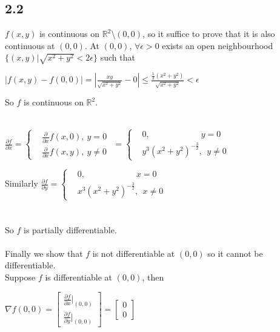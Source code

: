\documentclass[12pt,a4paper,titlepage]{article}
\begin{document}
\subsection*{2.2}
$f(x,y)$ is continuous on $\mathbb{R}^2$\textbackslash$(0,0)$, so it suffice to prove that it is also continuous at $(0,0)$. At $(0,0)$, $\forall \epsilon > 0$ exists an open neighbourhood 
$\{(x,y)|\sqrt{x^2+y^2}<2\epsilon\}$ such that
\begin{center}
	$|f(x,y)-f(0,0)|=|\frac{xy}{\sqrt{x^2+y^2}}-0|\leq\frac{\frac{1}{2}(x^2+y^2)}{\sqrt{x^2+y^2}}<\epsilon$\\
\end{center}
So $f$ is continuous on $\mathbb{R}^2$.\\\\
\begin{center}
$\frac{\partial f}{\partial x}=\begin{cases}
								& \frac{\partial}{\partial x}f(x,0),\: y=0\\
								& \frac{\partial}{\partial x}f(x,y),\: y\neq 0
								\end{cases}$ \hspace{1em}
$=\begin{cases}
& 0,\quad\quad\quad\quad\quad\quad y=0\\
& y^3(x^2+y^2)^{-\frac{3}{2}},\:\: y\neq 0
\end{cases}$\\ \vspace{2em}
\end{center}
Similarly 
$\frac{\partial f}{\partial y}=\begin{cases}
								& 0,\quad\quad\quad\quad\quad\quad x=0\\
								& x^3(x^2+y^2)^{-\frac{3}{2}},\:\: x\neq 0
\end{cases}$\\\\\\
So $f$ is partially differentiable.\\\\
Finally we show that $f$ is not differentiable at $(0,0)$ so it cannot be differentiable.\\
Suppose $f$ is differentiable at $(0,0)$, then\\
\begin{center}
$\nabla f(0,0)=\left[ \begin{array}{cc}
							\frac{\partial f}{\partial x}|_{(0,0)}\\
							\frac{\partial f}{\partial y}|_{(0,0)}
						\end{array}
				\right] = \left[ \begin{array}{c}
									0\\
									0
									\end{array}
							\right]$\\
\end{center}
\end{document}
